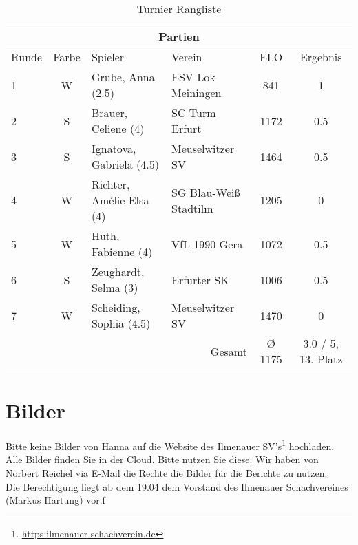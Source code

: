 \begin{table}[htbp]
\centering
\caption{Turnier Rangliste}
\begin{tabular}{|l|c|l|l|c|c|}
\hline
\multicolumn{6}{|c|}{Partien} \\
\hline
Runde & Farbe & Spieler & Verein & ELO & Ergebnis \\
\hline
1 & W & Grube, Anna (2.5) & ESV Lok Meiningen & 841 & 1 \\
2 & S & Brauer, Celiene (4) & SC Turm Erfurt & 1172 & 0.5 \\
3 & S & Ignatova, Gabriela (4.5) & Meuselwitzer SV & 1464 & 0.5 \\
4 & W & Richter, Amélie Elsa (4) & SG Blau-Weiß Stadtilm & 1205 & 0 \\
5 & W & Huth, Fabienne (4) & VfL 1990 Gera & 1072 & 0.5 \\
6 & S & Zeughardt, Selma (3) & Erfurter SK & 1006 & 0.5 \\
7 & W & Scheiding, Sophia (4.5) & Meuselwitzer SV & 1470 & 0 \\
\hline
\multicolumn{4}{|r|}{Gesamt} & Ø 1175 & 3.0 / 5, 13. Platz \\
\hline
\end{tabular}
\end{table}

\section{Bilder}
Bitte keine Bilder von Hanna auf die Website des Ilmenauer SV's\footnote{\url{https:ilmenauer-schachverein.de}} hochladen.
\vspace{0.5cm}
Alle Bilder finden Sie in der Cloud. Bitte nutzen Sie diese. Wir haben von Norbert Reichel via E-Mail die Rechte die Bilder für die Berichte zu nutzen. \\
Die Berechtigung liegt ab dem 19.04 dem Vorstand des Ilmenauer Schachvereines (Markus Hartung) vor.f